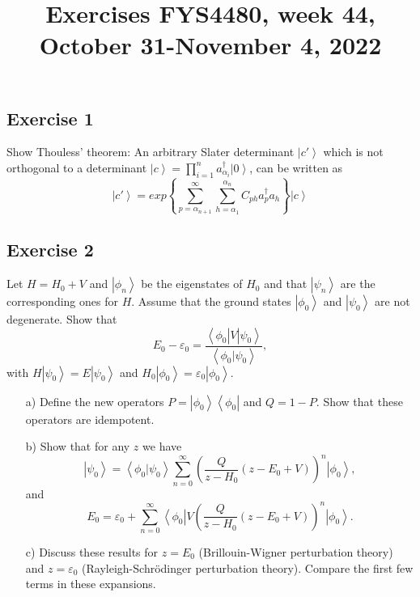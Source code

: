 \documentclass[prc]{revtex4}
\newcommand{\bra}[1]{\left\langle #1 \right|}
\newcommand{\ket}[1]{\left| #1 \right\rangle}
\begin{document}
\title{Exercises FYS4480, week 44, October 31-November 4, 2022}

\maketitle



\subsection*{Exercise 1}
Show Thouless' theorem: An arbitrary Slater determinant $\ket{c'}$ which is not orthogonal to a determinant
$\ket{c}={\displaystyle\prod_{i=1}^{n}}
a_{\alpha_{i}}^{\dagger}\ket{0}$, can be written as
\[
\ket{c'}=exp\left\{\sum_{p=\alpha_{n+1}}^{\infty}
\sum_{h=\alpha_{1}}^{\alpha_{n}}C_{ph}a_{p}^{\dagger}
a_{h}\right\}\ket{c}
\]


\subsection*{Exercise 2}
Let $H=H_0 +V$ and $\ket{\phi_n}$ be the eigenstates of $H_0$ and that
$\ket{\psi_n}$ are the corresponding ones for $H$. 
Assume that the ground states
$\ket{\phi_0}$ and $\ket{\psi_0}$ are not degenerate. Show that
\[
E_0 -\varepsilon_0 =\frac{\bra{\phi_0} V\ket{\psi_0}}
{\left\langle \phi_0 | \psi_0 \right\rangle},
\]
with $H\ket{\psi_0} =E\ket{\psi_0}$ and
$H_0\ket{\phi_0} =\varepsilon_0\ket{\phi_0}$.
\begin{enumerate}
\item[a)]
Define the new operators $P=\ket{\phi_0}\bra{\phi_0}$ and $Q=1-P$. Show that these operators are idempotent.
\item[b)]
Show that for any  $z$ we have 
\[
\ket{\psi_0}=
	    \left\langle \phi_0 | \psi_0 \right\rangle
	    \sum_{n=0}^{\infty}\left(\frac{Q}{z-H_0}(z-E_0+V)\right)^n
	    \ket{\phi_0},
\]
and
\[
E_0=\varepsilon_0+
    \sum_{n=0}^{\infty}\bra{\phi_0}V
    \left(\frac{Q}{z-H_0}(z-E_0+V)\right)^n
    \ket{\phi_0}.
\]
\item[c)]
Discuss these results  for $z=E_0$ (Brillouin-Wigner perturbation theory)
and $z=\varepsilon_0$ (Rayleigh-Schr\"{o}dinger perturbation theory).
Compare the first few terms in these expansions.
\end{enumerate}
\end{document}
